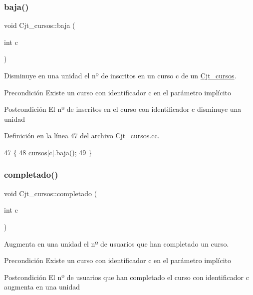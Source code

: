 \subsubsection{\texorpdfstring{baja()}{baja()}}
{\footnotesize\ttfamily void Cjt\+\_\+cursos\+::baja (\begin{DoxyParamCaption}\item[{int}]{c }\end{DoxyParamCaption})}



Disminuye en una unidad el nº de inscritos en un curso c de un \mbox{\hyperlink{class_cjt__cursos}{Cjt\+\_\+cursos}}. 

\begin{DoxyPrecond}{Precondición}
Existe un curso con identificador c en el parámetro implícito 
\end{DoxyPrecond}
\begin{DoxyPostcond}{Postcondición}
El nº de inscritos en el curso con identificador c disminuye una unidad 
\end{DoxyPostcond}


Definición en la línea 47 del archivo Cjt\+\_\+cursos.\+cc.


\begin{DoxyCode}
47                                \{
48       \mbox{\hyperlink{class_cjt__cursos_a582f9540bc295212450dba4cd18c8886}{cursos}}[c].baja();
49     \}
\end{DoxyCode}
\mbox{\label{class_cjt__cursos_a140c61d43f549aa71503f5b8b080c48c}} 
\subsubsection{\texorpdfstring{completado()}{completado()}}
{\footnotesize\ttfamily void Cjt\+\_\+cursos\+::completado (\begin{DoxyParamCaption}\item[{int}]{c }\end{DoxyParamCaption})}



Augmenta en una unidad el nº de usuarios que han completado un curso. 

\begin{DoxyPrecond}{Precondición}
Existe un curso con identificador c en el parámetro implícito 
\end{DoxyPrecond}
\begin{DoxyPostcond}{Postcondición}
El nº de usuarios que han completado el curso con identificador c augmenta en una unidad 
\end{DoxyPostcond}


